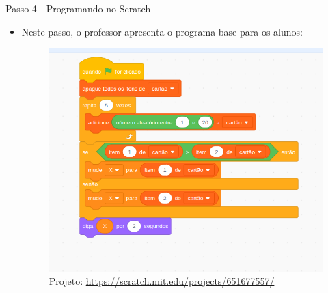 \documentclass{beamer}
\begin{document}
\begin{frame}{Passo 4 - Programando no Scratch}

\begin{itemize}

\item Neste passo, o professor apresenta o programa base para os alunos:


\begin{figure}
\begin{center}
	\includegraphics[scale=0.25]{images/EncontrandoMaior2.png} 
\end{center}
\caption{Projeto: \url{https://scratch.mit.edu/projects/651677557/}}
\end{figure}




\end{itemize}


\end{frame}

\end{document}
